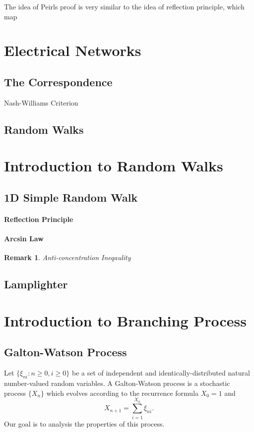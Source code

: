 \documentclass{article}
\newtheorem*{Rk}{Remark}
\theoremstyle{definition}
\begin{document}
The idea of Peirls proof is very similar to the idea of reflection principle,
which map 


\section{Electrical Networks}
\subsection{The Correspondence}

Nash-Williams Criterion

\subsection{Random Walks}


\section{Introduction to Random Walks}
\subsection{1D Simple Random Walk}
\paragraph{Reflection Principle}

\paragraph{Arcsin Law}

\begin{Rk}
    Anti-concentration Ineqaulity
\end{Rk}

\subsection{Lamplighter}


\section{Introduction to Branching Process}
\subsection{Galton-Watson Process}
Let $\{\xi_{ni}:n\geq 0,i\geq 0\}$ be a set of independent and identically-distributed natural number-valued random variables.
A Galton-Watson process is a stochastic process $\{X_n\}$ which evolves according to the recurrence formula $X_0 = 1$ and 
\[ X_{n+1}=\sum_{i=1}^{X_n}\xi_{ni}.\]
Our goal is to analysis the properties of this process.
\end{document}
